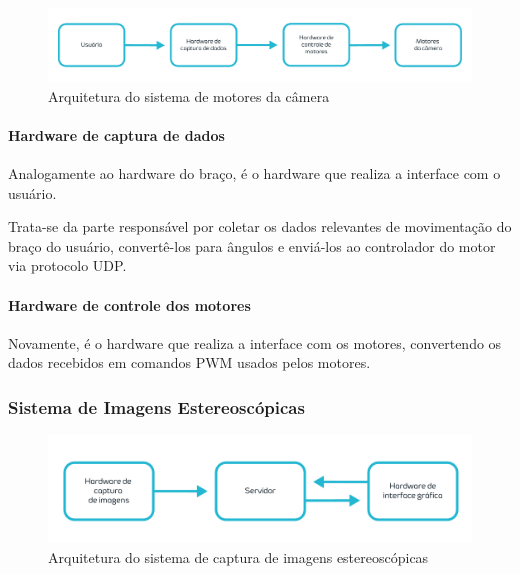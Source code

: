 		\begin{figure}[h!]
		\caption{\label{fig_arq-mot}   Arquitetura do sistema de motores da câmera}
		\begin{center}
			\includegraphics[width=\textwidth]{arq-mot.pdf}	
		\end{center}
	\end{figure}
	\paragraph{Hardware de captura de dados}\label{par-arq-motcapture}
	Analogamente ao hardware do braço, é o hardware que realiza a interface com o usuário.\par
	Trata-se da parte responsável por coletar os dados relevantes de movimentação do braço do usuário, convertê-los para ângulos e enviá-los ao controlador do motor via protocolo UDP.\par
	\paragraph{Hardware de controle dos motores}\label{par-arq-mottranslate}
	Novamente, é o hardware que realiza a interface com os motores, convertendo os dados recebidos em comandos PWM usados pelos motores.\par

	\subsubsection{Sistema de Imagens Estereoscópicas}\label{subsec-arq-cam}
		\begin{figure}[h!]
		\caption{\label{fig_arq-cam}   Arquitetura do sistema de captura de imagens estereoscópicas}
		\begin{center}
			\includegraphics[width=\textwidth]{arq-cam.pdf}	
		\end{center}
	\end{figure}
